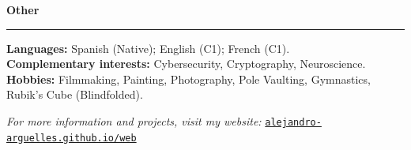 \documentclass[9pt,a4paper]{extarticle}
\newcommand{\cvsection}[1]{%
  \vspace{5pt}%
  {\large\textbf{#1}}\\[-4pt]%
  \rule{\linewidth}{0.6pt}\vspace{2pt}%
}
\begin{document}
\cvsection{Other}
\textbf{Languages:} Spanish (Native); English (C1); French (C1).\\
\textbf{Complementary interests:} Cybersecurity, Cryptography, Neuroscience.\\
\textbf{Hobbies:} Filmmaking, Painting, Photography, Pole Vaulting, Gymnastics, Rubik's Cube (Blindfolded).

\smallskip


\textit{For more information and projects, visit my website:} \href{https://alejandro-arguelles.github.io/web}{\texttt{alejandro-arguelles.github.io/web}}
\end{document}
